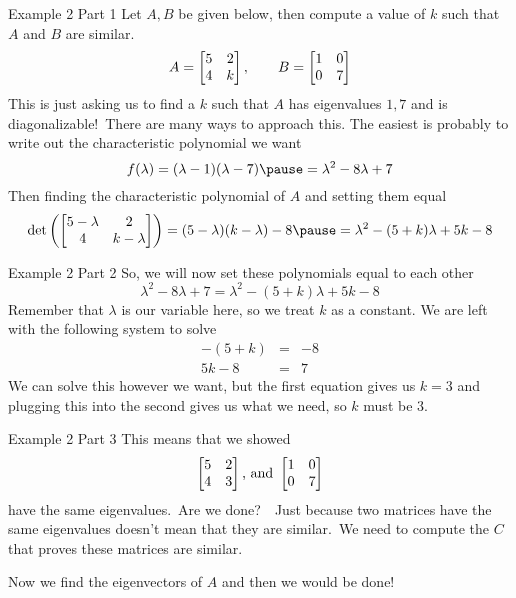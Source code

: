 \documentclass[xcoler=dvipsnames, aspectratio=169]{beamer}
\begin{document}
    \begin{frame}{Example 2 Part 1}
        \small
        Let $A,B$ be given below, then compute a value of $k$ such that $A$ and $B$ are similar.
        \[
            A = \begin{bmatrix}
                5 & 2\\
                4 & k
            \end{bmatrix},\qquad B=\begin{bmatrix}
                1 & 0\\
                0 & 7
            \end{bmatrix}
        \]\pause
        This is just asking us to find a $k$ such that $A$ has eigenvalues $1,7$ and is 
        diagonalizable!\pause\ There are many ways to approach this. The easiest is probably to 
        write out the characteristic polynomial we want
        \[
            f(\lambda) = (\lambda-1)(\lambda-7) \pause = \lambda^2 - 8\lambda + 7
        \]\pause
        Then finding the characteristic polynomial of $A$ and setting them equal
        \[
            \det{\bMat{
                5-\lambda & 2\\
                4 & k-\lambda
            }} = (5-\lambda)(k-\lambda) - 8 \pause = \lambda^2 - (5+k)\lambda + 5k-8
        \]
    \end{frame}
    \begin{frame}{Example 2 Part 2}
        So, we will now set these polynomials equal to each other\pause
        \[
            \lambda^2 - 8\lambda + 7 = \lambda^2 - (5+k)\lambda + 5k-8
        \]\pause
        Remember that $\lambda$ is our variable here, so we treat $k$ as a constant. We are left
        with the following system to solve
        \begin{eqnarray*}
            -(5+k) &=& -8\\
            5k-8   &=& 7
        \end{eqnarray*}\pause
        We can solve this however we want, but the first equation gives us $k=3$ and plugging this into
        the second gives us what we need, so $k$ must be $3$.
    \end{frame}
    \begin{frame}{Example 2 Part 3}
        This means that we showed
        \[
            \begin{bmatrix}
                5 & 2\\
                4 & 3
            \end{bmatrix}\textnormal{, and }\begin{bmatrix}
                1 & 0\\
                0 & 7
            \end{bmatrix}
        \]
        have the same eigenvalues.\pause\ Are we done?\pause\ \pause\ Just because
        two matrices have the same eigenvalues doesn't mean that they are similar.\pause\ We need to compute
        the $C$ that proves these matrices are similar.\pause\

        Now we find the eigenvectors of $A$ and then we would be done!
    \end{frame}
\end{document}
